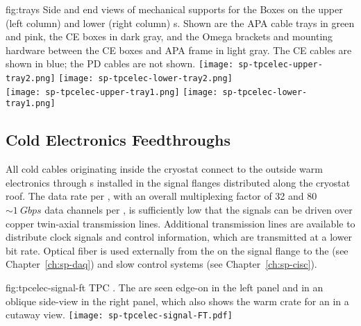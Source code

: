\begin{dunefigure}
{fig:trays}
{Side and end views of mechanical supports for the  
Boxes on the upper (left column) and lower (right column) 
s. Shown are the APA cable trays in green and pink, 
the CE boxes in dark gray, and the Omega brackets and mounting 
hardware between the CE boxes and APA frame in light gray.  
The CE cables are shown in blue; the PD cables are not shown.}
\texttt{[image: sp-tpcelec-upper-tray2.png]}
\hspace{5mm}
\texttt{[image: sp-tpcelec-lower-tray2.png]} \\
\texttt{[image: sp-tpcelec-upper-tray1.png]}
\hspace{5mm}
\texttt{[image: sp-tpcelec-lower-tray1.png]}
\end{dunefigure}

\subsection{Cold Electronics Feedthroughs}
\label{sec:fdsp-tpcelec-design-ft}

All cold cables originating inside the cryostat connect to the outside 
warm electronics through  \fdth{}s installed in the signal 
flanges distributed along the cryostat roof. The  data rate 
per , with an overall multiplexing factor of \num{32} and 
\num{80} $\sim\SI{1}{Gbps}$ data channels per , is 
sufficiently low that the  signals can be driven over 
copper twin-axial transmission lines. Additional transmission lines 
are available to distribute  clock signals and  
control information, which are transmitted at a lower bit rate.
Optical fiber is used externally from the  on the signal 
flange to the  (see Chapter~\ref{ch:sp-daq}) and slow 
control systems (see Chapter~\ref{ch:sp-cisc}).

\begin{dunefigure}
{fig:tpcelec-signal-ft}
{TPC  \fdth. The  are seen edge-on in the left 
panel and in an oblique side-view in the right panel, which also shows 
the warm crate for an  in a cutaway view.}
\texttt{[image: sp-tpcelec-signal-FT.pdf]}
\end{dunefigure}

